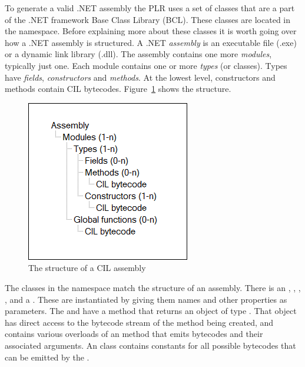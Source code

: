 	To generate a valid .NET assembly the PLR uses a set of classes that are a 
	part of the .NET framework Base Class Library (BCL). These classes are 
	located in the  namespace. Before explaining 
	more about these classes it is worth going over how a .NET assembly is 
	structured. A .NET \textit{assembly} is an executable file (.exe) or a 
	dynamic link library (.dll). The assembly contains one more 
	\textit{modules}, typically just one. Each module contains one or more 
	\textit{types} (or classes). Types have \textit{fields}, 
	\textit{constructors} and \textit{methods}. At the lowest level, 
	constructors and methods contain CIL bytecodes. Figure~\ref{fig:assembly} 
	shows the structure.

	\begin{figure}[h!]
		\centering
		\includegraphics[scale=0.7]{assembly.png}
		\caption{The structure of a CIL assembly}
		\label{fig:assembly}
	\end{figure}
	
	The classes in the  namespace match the 
	structure of an assembly. There is an , 
	, , , 
	 and a . These are instantiated 
	by giving them names and other properties as parameters. The 
	 and  have a 
	 method that returns an object of type 
	. That object has direct access to the bytecode stream of 
	the method being created, and contains various overloads of an  
	method that emits bytecodes and their associated arguments. An 
	 class contains constants for all possible bytecodes that can 
	be emitted by the .
	
